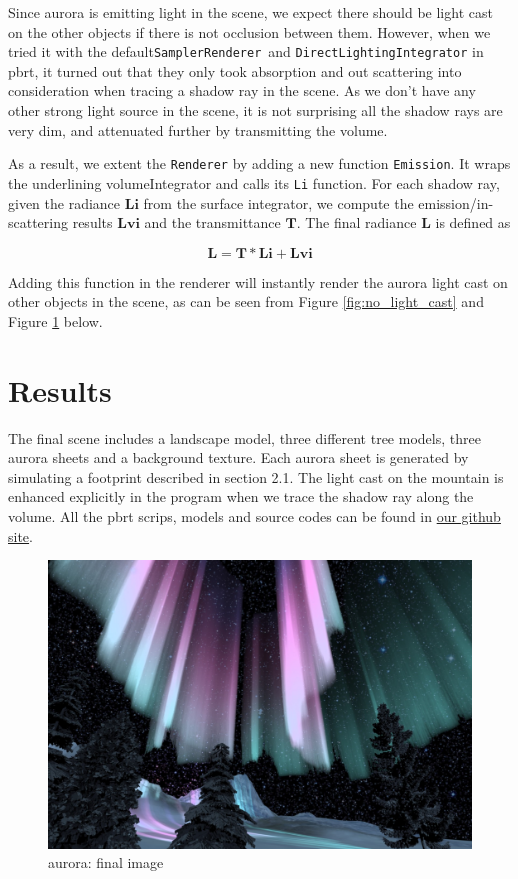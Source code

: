 \documentclass[10pt,a4paper]{article}
\begin{document}
Since aurora is emitting light in the scene, we expect there should be light cast on the other objects if there is not occlusion between them. However, when we tried it with the default\texttt{SamplerRenderer}\ and \texttt{DirectLightingIntegrator} in pbrt, it turned out that they only took absorption and out scattering into consideration when tracing a shadow ray in the scene. As we don't have any other strong light source in the scene, it is not surprising all the shadow rays are very dim, and attenuated further by transmitting the volume.

As a result, we extent the \texttt{Renderer} by adding a new function \texttt{Emission}. It wraps the underlining volumeIntegrator and calls its \texttt{Li} function. For each shadow ray, given the radiance $\mathbf{Li}$ from the surface integrator, we compute the emission/in-scattering results $\mathbf{Lvi}$ and the transmittance $\mathbf{T}$. The final radiance $\mathbf{L}$ is defined as

\[
\mathbf{L = T * Li + Lvi}
\]

Adding this function in the renderer will instantly render the aurora light cast on other objects in the scene, as can be seen from Figure \ref{fig:no_light_cast} and Figure \ref{fig:aurora} below.

\section{Results}

The final scene includes a landscape model, three different tree models, three aurora sheets and a background texture. Each aurora sheet is generated by simulating a footprint described in section 2.1. The light cast on the mountain is enhanced explicitly in the program when we trace the shadow ray along the volume. All the pbrt scrips, models and source codes can be found in \href{https://github.com/dut09/pbrt-v2}{our github site}. 

\begin{figure}[h]
\centering
\includegraphics[width=0.95\linewidth]{./aurora}
\caption{aurora: final image}
\label{fig:aurora}
\end{figure}
\end{document}
